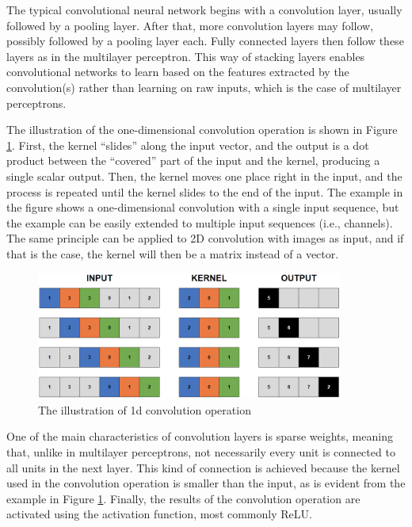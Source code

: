 The typical convolutional neural network begins with a convolution layer, usually followed by a pooling layer. After that, more convolution layers may follow, possibly followed by a pooling layer each. Fully connected layers then follow these layers as in the multilayer perceptron. This way of stacking layers enables convolutional networks to learn based on the features extracted by the convolution(s) rather than learning on raw inputs, which is the case of multilayer perceptrons.

The illustration of the one-dimensional convolution operation is shown in Figure \ref{fig:Conv1d}. First, the kernel ``slides'' along the input vector, and the output is a dot product between the ``covered'' part of the input and the kernel, producing a single scalar output. Then, the kernel moves one place right in the input, and the process is repeated until the kernel slides to the end of the input. The example in the figure shows a one-dimensional convolution with a single input sequence, but the example can be easily extended to multiple input sequences (i.e., channels). The same principle can be applied to 2D convolution with images as input, and if that is the case, the kernel will then be a matrix instead of a vector.

\begin{figure}
    \centering
    \includegraphics[width=0.9\textwidth]{slike/conv1d.png}
    \caption{The illustration of 1d convolution operation}
    \label{fig:Conv1d}
\end{figure}

One of the main characteristics of convolution layers is sparse weights, meaning that, unlike in multilayer perceptrons, not necessarily every unit is connected to all units in the next layer. This kind of connection is achieved because the kernel used in the convolution operation is smaller than the input, as is evident from the example in Figure \ref{fig:Conv1d}. Finally, the results of the convolution operation are activated using the activation function, most commonly ReLU.

